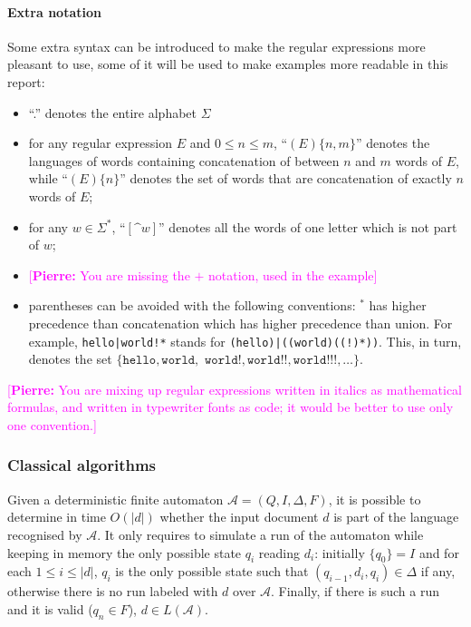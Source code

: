\documentclass[12px]{article}
\theoremstyle{definition}
\newcommand{\pierre}[1]{\textcolor{magenta}{[\textbf{Pierre:} #1]}}
\begin{document}
        \paragraph{Extra notation}
          Some extra syntax can be introduced to make the
          regular expressions more pleasant to use, some of it will be used to
          make examples more readable in this report:
            \begin{itemize}
              \item ``.'' denotes the entire alphabet $\Sigma$
              \item for any regular expression $E$ and $0 \leq n \leq m$,
                ``$(E)\{n,m\}$'' denotes the languages of words containing
                concatenation of between $n$ and $m$ words of $E$, while
                ``$(E)\{n\}$'' denotes the set of words that are concatenation
                of exactly $n$ words of $E$;
              \item for any $w \in \Sigma^*$,
                ``$[\texttt{\textasciicircum}w]$'' denotes all the words of one
                letter which is not part of $w$;
              \item \pierre{You are missing the $+$ notation, used in the
                example}
              \item parentheses can be avoided with the following conventions:
                ${}^*$ has higher precedence than concatenation which has
                higher precedence than union. For example,
                \texttt{hello|world!*} stands for
                \texttt{(hello)|((world)((!)*))}. This, in turn, denotes the set
                $\{\texttt{hello}, \texttt{world},$ $\texttt{world!},
                \texttt{world!!}, \texttt{world!!!}, \ldots\}$.
            \end{itemize}

            \pierre{You are mixing up regular expressions written in
            italics as mathematical formulas, and written in typewriter
            fonts as code; it would be better to use only one
            convention.}

      \subsubsection{Classical algorithms}

        Given a deterministic finite automaton $\mathcal{A} = (Q, I, \Delta,
        F)$, it is possible to determine in time $O(|d|)$ whether the input
        document $d$ is part of the language recognised by $\mathcal{A}$. It
        only requires to simulate a run of the automaton while keeping in
        memory the only possible state $q_i$ reading $d_i$: initially $\{q_0\}
        = I$ and for each $1 \leq i \leq |d|$, $q_{i}$ is the only possible
        state such that $(q_{i-1}, d_i, q_i) \in \Delta$ if any, otherwise
        there is no run labeled with $d$ over $\mathcal{A}$. Finally, if
        there is
        such a run and it is valid ($q_n \in F$), $d \in L(\mathcal{A})$.
\end{document}

